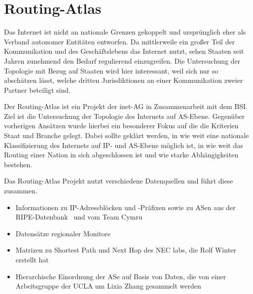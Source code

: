 \section{Routing-Atlas}\label{sec:routingatlas}

Das Internet ist nicht an nationale Grenzen gekoppelt und ursprünglich eher als Verband autonomer Entitäten entworfen.
Da mittlerweile ein großer Teil der Kommunikation und des Geschäftslebens das Internet nutzt, sehen Staaten seit Jahren zunehmend den Bedarf regulierend einzugreifen.
Die Untersuchung der Topologie mit Bezug auf Staaten wird hier interessant, weil sich nur so abschätzen lässt, welche dritten Jurisdiktionen an einer Kommunikation zweier Partner beteiligt sind.

Der Routing-Atlas ist ein Projekt der inet-AG in Zusammenarbeit mit dem BSI.
Ziel ist die Untersuchung der Topologie des Internets auf AS-Ebene.
Gegenüber vorherigen Ansätzen wurde hierbei ein besonderer Fokus auf die die Kriterien Staat und Branche gelegt.
Dabei sollte geklärt werden, in wie weit eine nationale Klassifizierung des Internets auf IP- und AS-Ebene möglich ist, in wie weit das Routing einer Nation in sich abgeschlossen ist und wie starke Abhängigkeiten bestehen.

Das Routing-Atlas Projekt nutzt verschiedene Datenquellen und führt diese zusammen.
\begin{itemize}
  \item Informationen zu IP-Adressblöcken und -Präfixen sowie zu ASen aus der RIPE-Datenbank~\cite{ripe-db} und vom Team Cymru~\cite{cymru}
  \item Datensätze regionaler Monitore~\cite{ripe-ris}
  \item Matrizen zu Shortest Path und Next Hop des NEC labs, die Rolf Winter erstellt hat~\cite{neclab-topology, Winter:2009:MIR:1577959.1577976}
  \item Hierarchische Einordnung der ASe auf Basis von Daten, die von einer Arbeitsgruppe der UCLA um Lixia Zhang gesammelt werden~\cite{ucla-topology, Zhang:2005:CIA:1052812.1052825}
\end{itemize}
